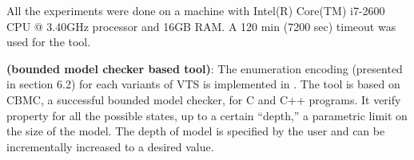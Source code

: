 All the experiments were done
on a machine with Intel(R) Core(TM) i7-2600 CPU @ 3.40GHz processor and 16GB RAM.
%
A 120 min (7200 sec) timeout was used for the tool.

%

%

\textbf{{\sattool} (bounded model checker based tool)}:
The enumeration encoding (presented in section 6.2) for each variants of VTS is implemented in {\sattool}.
The tool is based on CBMC, a successful bounded model checker, for C and C++ programs. 
%
%
It verify property for all the possible states, up to a certain “depth,” a parametric limit on the size of the model.
%
The depth of model is specified by the user and can be  incrementally increased to a desired value.
%
%

